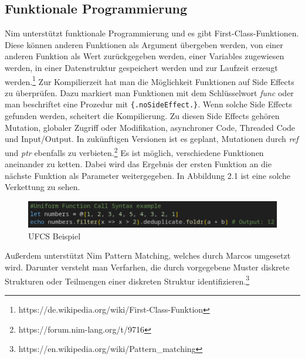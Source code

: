 \documentclass[11pt]{report}
\begin{document}
\subsection{Funktionale Programmierung}
Nim unterstützt funktionale Programmierung und es gibt First-Class-Funktionen. Diese können anderen Funktionen als Argument übergeben werden, von einer anderen Funktion als Wert zurückgegeben werden, einer Variables zugewiesen werden, in einer Datenstruktur gespeichert werden und zur Laufzeit erzeugt werden.\footnote{https://de.wikipedia.org/wiki/First-Class-Funktion}
\newline
Zur Kompilierzeit hat man die Möglichkeit Funktionen auf Side Effects zu überprüfen. Dazu markiert man Funktionen mit dem Schlüsselwort \emph{func} oder man beschriftet eine Prozedur mit \verb|{.noSideEffect.}|. Wenn solche Side Effects gefunden werden, scheitert die Kompilierung. Zu diesen Side Effects gehören Mutation, globaler Zugriff oder Modifikation, asynchroner Code, Threaded Code und Input/Output. In zukünftigen Versionen ist es geplant, Mutationen durch \emph{ref} und \emph{ptr} ebenfalls zu verbieten.\footnote{https://forum.nim-lang.org/t/9716}
\newline
Es ist möglich, verschiedene Funktionen aneinander zu ketten. Dabei wird das Ergebnis der ersten Funktion an die nächste Funktion als Parameter weitergegeben. In Abbildung 2.1 ist eine solche Verkettung zu sehen.
\begin{figure}[htp]
\centering
\includegraphics[scale=0.40]{images/image4.png}
\caption{UFCS Beispiel}
\label{}
\end{figure}
\newline
Außerdem unterstützt Nim Pattern Matching, welches durch Marcos umgesetzt wird. Darunter versteht man Verfarhen, die durch vorgegebene Muster diskrete Strukturen oder Teilmengen einer diskreten Struktur identifizieren.\footnote{https://en.wikipedia.org/wiki/Pattern\_matching}
\end{document}
